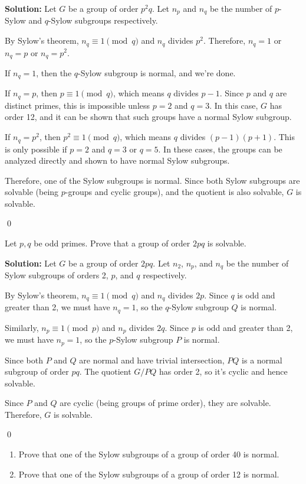 \noindent\textbf{Solution:} Let $G$ be a group of order $p^2q$. Let $n_p$ and $n_q$ be the number of $p$-Sylow and $q$-Sylow subgroups respectively.

By Sylow's theorem, $n_q \equiv 1 \pmod{q}$ and $n_q$ divides $p^2$. Therefore, $n_q = 1$ or $n_q = p$ or $n_q = p^2$.

If $n_q = 1$, then the $q$-Sylow subgroup is normal, and we're done.

If $n_q = p$, then $p \equiv 1 \pmod{q}$, which means $q$ divides $p-1$. Since $p$ and $q$ are distinct primes, this is impossible unless $p = 2$ and $q = 3$. In this case, $G$ has order 12, and it can be shown that such groups have a normal Sylow subgroup.

If $n_q = p^2$, then $p^2 \equiv 1 \pmod{q}$, which means $q$ divides $(p-1)(p+1)$. This is only possible if $p = 2$ and $q = 3$ or $q = 5$. In these cases, the groups can be analyzed directly and shown to have normal Sylow subgroups.

Therefore, one of the Sylow subgroups is normal. Since both Sylow subgroups are solvable (being $p$-groups and cyclic groups), and the quotient is also solvable, $G$ is solvable.


\qed
\begin{problembox}
Let $p, q$ be odd primes. Prove that a group of order $2pq$ is solvable.
\end{problembox}

\noindent\textbf{Solution:} Let $G$ be a group of order $2pq$. Let $n_2$, $n_p$, and $n_q$ be the number of Sylow subgroups of orders 2, $p$, and $q$ respectively.

By Sylow's theorem, $n_q \equiv 1 \pmod{q}$ and $n_q$ divides $2p$. Since $q$ is odd and greater than 2, we must have $n_q = 1$, so the $q$-Sylow subgroup $Q$ is normal.

Similarly, $n_p \equiv 1 \pmod{p}$ and $n_p$ divides $2q$. Since $p$ is odd and greater than 2, we must have $n_p = 1$, so the $p$-Sylow subgroup $P$ is normal.

Since both $P$ and $Q$ are normal and have trivial intersection, $PQ$ is a normal subgroup of order $pq$. The quotient $G/PQ$ has order 2, so it's cyclic and hence solvable.

Since $P$ and $Q$ are cyclic (being groups of prime order), they are solvable. Therefore, $G$ is solvable.


\qed
\begin{problembox}
\begin{enumerate}[label=(\alph*)]
\item Prove that one of the Sylow subgroups of a group of order 40 is normal.
\item Prove that one of the Sylow subgroups of a group of order 12 is normal.
\end{enumerate}
\end{problembox}


